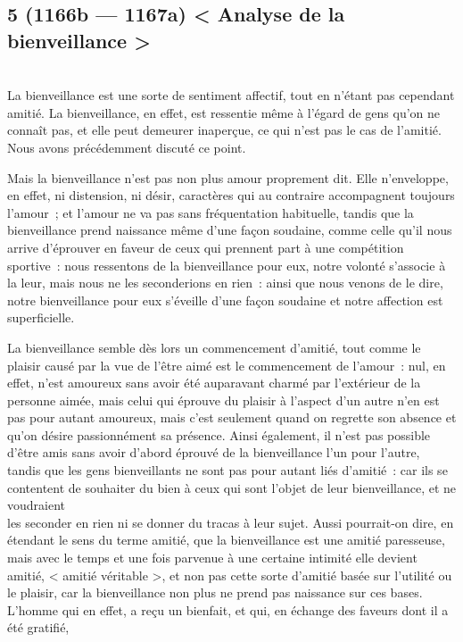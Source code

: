 \documentclass[french,twoside]{book} %
\begin{document}
\subsection[{5 (1166b — 1167a) < Analyse de la bienveillance >}]{5 (1166b — 1167a) < Analyse de la bienveillance >}
\noindent \\
La bienveillance est une sorte de sentiment affectif, tout en n’étant pas cependant amitié. La bienveillance, en effet, est ressentie même à l’égard de gens qu’on ne connaît pas, et elle peut demeurer inaperçue, ce qui n’est pas le cas de l’amitié. Nous avons précédemment discuté ce point.\par
Mais la bienveillance n’est pas non plus amour proprement dit. Elle n’enveloppe, en effet, ni distension, ni désir, caractères qui au contraire accompagnent toujours l’amour ; et l’amour ne va pas sans fréquentation habituelle, tandis que la \\
bienveillance prend naissance même d’une façon soudaine, comme celle qu’il nous arrive d’éprouver en faveur de ceux qui  prennent part à une compétition sportive : nous ressentons de la bienveillance pour eux, notre volonté s’associe à la leur, mais nous ne les seconderions en rien : ainsi que nous venons de le dire, notre bienveillance pour eux s’éveille d’une façon soudaine et notre affection est superficielle.\par
La bienveillance semble dès lors un commencement d’amitié, tout comme le plaisir causé par la vue de l’être aimé est le commencement de l’amour : nul, en effet, n’est amoureux sans avoir été auparavant charmé par l’extérieur de la \\
personne aimée, mais celui qui éprouve du plaisir à l’aspect d’un autre n’en est pas pour autant amoureux, mais c’est seulement quand on regrette son absence et qu’on désire passionnément sa présence. Ainsi également, il n’est pas possible d’être amis sans avoir d’abord éprouvé de la bienveillance l’un pour l’autre, tandis que les gens bienveillants ne sont pas pour autant liés d’amitié : car ils se contentent de souhaiter du bien à ceux qui sont l’objet de leur bienveillance, et ne voudraient \\
les seconder en rien ni se donner du tracas à leur sujet. Aussi pourrait-on dire, en étendant le sens du terme amitié, que la bienveillance est une amitié paresseuse, mais avec le temps et une fois parvenue à une certaine intimité elle devient amitié, < amitié véritable >, et non pas cette sorte d’amitié basée sur l’utilité ou le plaisir, car la bienveillance non plus ne prend pas naissance sur ces bases. L’homme qui en effet, a reçu un bienfait, et qui, en échange des faveurs dont il a été gratifié, \\
\end{document}
